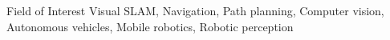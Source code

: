 \begin{rSection}{Field of Interest}
Visual \ac{SLAM}, Navigation, Path planning, Computer vision, Autonomous vehicles, Mobile robotics, Robotic perception
\end{rSection}

